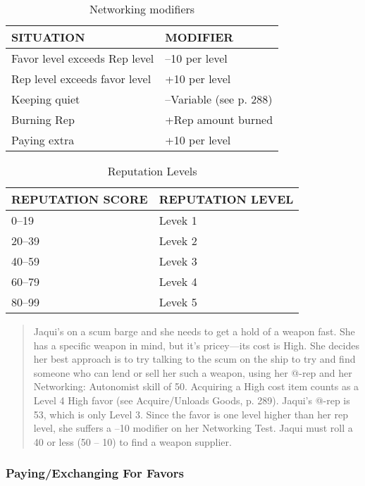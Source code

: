 \begin{table}
\caption{Networking modifiers}
\begin{tabular}{|l|l|}
\hline
SITUATION & MODIFIER \\
\hline
Favor level exceeds Rep level & –10 per level \\
\hline
Rep level exceeds favor level & +10 per level \\
\hline
Keeping quiet & –Variable (see p. 288) \\
\hline
Burning Rep & +Rep amount burned \\
\hline
Paying extra & +10 per level \\
\hline
\end{tabular}
\end{table}

\begin{table}
\caption{Reputation Levels}
\begin{tabular}{|l|l|}
\hline
REPUTATION SCORE & REPUTATION LEVEL \\
\hline
0–19 & Levek 1 \\
\hline
20–39 & Levek 2 \\
\hline
40–59 & Levek 3 \\
\hline
60–79 & Levek 4 \\
\hline
80–99 & Levek 5 \\
\hline
\end{tabular}
\end{table}

\begin{quotation}
Jaqui’s on a scum barge and she needs to get a
hold of a weapon fast. She has a specific weapon in
mind, but it’s pricey—its cost is High. She decides
her best approach is to try talking to the scum on
the ship to try and find someone who can lend or
sell her such a weapon, using her @-rep and her
Networking: Autonomist skill of 50. Acquiring a
High cost item counts as a Level 4 High favor (see
Acquire/Unloads Goods, p. 289). Jaqui’s @-rep
is 53, which is only Level 3. Since the favor is one
level higher than her rep level, she suffers a –10
modifier on her Networking Test. Jaqui must roll a
40 or less (50 – 10) to find a weapon supplier.
\end{quotation}


\subsubsection{Paying/Exchanging For Favors}

